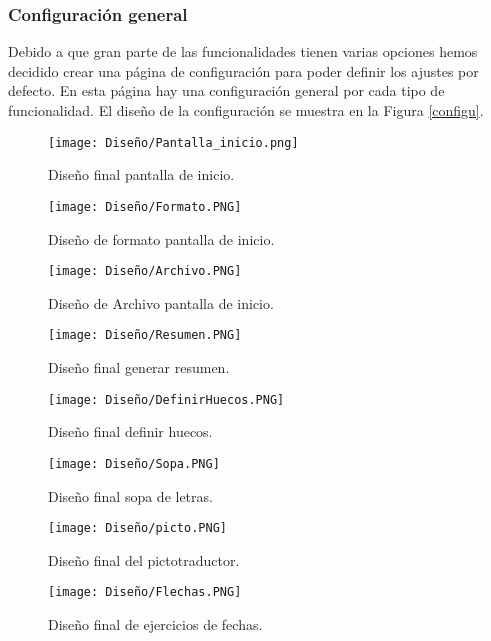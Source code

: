  \subsubsection{Configuración general}
 Debido a que gran parte de las funcionalidades tienen varias opciones hemos decidido crear una página de configuración para poder definir los ajustes por defecto. En esta página hay una configuración general por cada tipo de funcionalidad. El diseño de la configuración se muestra en la Figura \ref{configu}.

 
\begin{figure}[ht!]
  \centering
  \texttt{[image: Diseño/Pantalla\_inicio.png]}
  \caption{Diseño final pantalla de inicio.}
  \label{pantallaInicio}
\end{figure}

\begin{figure}[ht!]
  \centering
  \texttt{[image: Diseño/Formato.PNG]}
  \caption{Diseño de formato pantalla de inicio.}
  \label{Forato}
\end{figure}

\begin{figure}[ht!]
  \centering
  \texttt{[image: Diseño/Archivo.PNG]}
  \caption{Diseño de Archivo pantalla de inicio.}
  \label{archivo}
\end{figure}

\begin{figure}[ht!]
  \centering
  \texttt{[image: Diseño/Resumen.PNG]}
  \caption{Diseño final generar resumen.}
  \label{resuemn}
\end{figure}

\begin{figure}[ht!]
  \centering
  \texttt{[image: Diseño/DefinirHuecos.PNG]}
  \caption{Diseño final definir huecos.}
  \label{definir_hueco}
\end{figure}

\begin{figure}[ht!]
  \centering
  \texttt{[image: Diseño/Sopa.PNG]}
  \caption{Diseño final sopa de letras.}
  \label{sopaLetras}
\end{figure}

\begin{figure}[ht!]
  \centering
  \texttt{[image: Diseño/picto.PNG]}
  \caption{Diseño final del pictotraductor.}
  \label{pictotraductor}
\end{figure}

\begin{figure}[ht!]
  \centering
  \texttt{[image: Diseño/Flechas.PNG]}
  \caption{Diseño final de ejercicios de fechas.}
  \label{flechas}
\end{figure}

